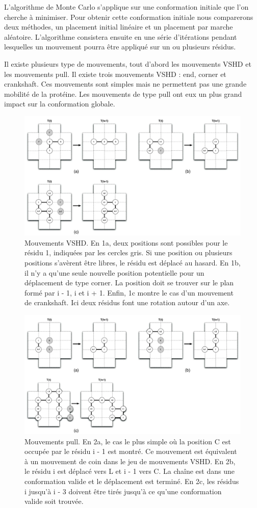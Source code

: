 L'algorithme de Monte Carlo s'applique sur une conformation initiale que l'on cherche à minimiser. Pour obtenir cette conformation initiale nous comparerons deux méthodes, un placement initial linéaire et un placement par marche aléatoire. L'algorithme consistera ensuite en une série d'itérations pendant lesquelles un mouvement pourra être appliqué sur un ou plusieurs résidus.

Il existe plusieurs type de mouvements, tout d'abord les mouvements VSHD et les mouvements pull. Il existe trois mouvements VSHD : end, corner et crankshaft. Ces mouvements sont simples mais ne permettent pas une grande mobilité de la protéine. Les mouvements de type pull ont eux un plus grand impact sur la conformation globale.

\begin{figure}[H]
    \centering
    \includegraphics[width=.8\textwidth]{figures/VSHD.png}
    \caption{Mouvements VSHD. En 1a, deux positions sont possibles pour le résidu 1, indiquées par les cercles gris. Si une position ou plusieurs positions s'avèrent être libres, le résidu est déplacé au hasard. En 1b, il n'y a qu'une seule nouvelle position potentielle pour un déplacement de type corner. La position doit se trouver sur le plan formé par i - 1, i et i + 1. Enfin, 1c montre le cas d'un mouvement de crankshaft. Ici deux résidus font une rotation autour d'un axe.}
    \label{fig:VSHD}
\end{figure}

\begin{figure}[H]
    \centering
    \includegraphics[width=.8\textwidth]{figures/pull.png}
    \caption{Mouvements pull. En 2a, le cas le plus simple où la position C est occupée par le résidu i - 1 est montré. Ce mouvement est équivalent à un mouvement de coin dans le jeu de mouvements VSHD. En 2b, le résidu i est déplacé vers L et i - 1 vers C. La chaîne est dans une conformation valide et le déplacement est terminé. En 2c, les résidus i jusqu'à i - 3 doivent être tirés jusqu'à ce qu'une conformation valide soit trouvée.}
    \label{fig:pull}
\end{figure}

